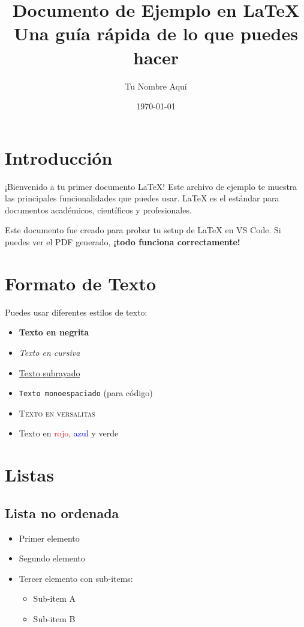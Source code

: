 \documentclass[12pt, a4paper]{article}
\title{
    \textbf{Documento de Ejemplo en \LaTeX}\\[0.5em]
    \large Una guía rápida de lo que puedes hacer
}
\author{Tu Nombre Aquí}
\date{\today}
\begin{document}
\maketitle
\tableofcontents
\newpage

\section{Introducción}

¡Bienvenido a tu primer documento \LaTeX! Este archivo de ejemplo te muestra las principales funcionalidades que puedes usar. \LaTeX{} es el estándar para documentos académicos, científicos y profesionales.

Este documento fue creado para probar tu setup de \LaTeX{} en VS Code. Si puedes ver el PDF generado, \textbf{¡todo funciona correctamente!}

\section{Formato de Texto}

Puedes usar diferentes estilos de texto:

\begin{itemize}
    \item \textbf{Texto en negrita}
    \item \textit{Texto en cursiva}
    \item \underline{Texto subrayado}
    \item \texttt{Texto monoespaciado} (para código)
    \item \textsc{Texto en versalitas}
    \item Texto en \textcolor{red}{rojo}, \textcolor{blue}{azul} y \textcolor{green!50!black}{verde}
\end{itemize}

\section{Listas}

\subsection{Lista no ordenada}
\begin{itemize}[label=\textbullet]
    \item Primer elemento
    \item Segundo elemento
    \item Tercer elemento con sub-items:
    \begin{itemize}
        \item Sub-item A
        \item Sub-item B
    \end{itemize}
\end{itemize}
\end{document}
